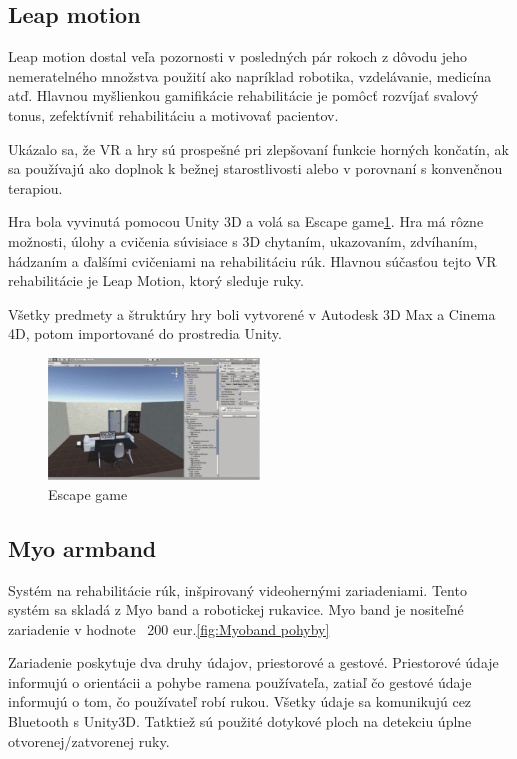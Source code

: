 \documentclass[10pt,twoside,slovak,a4paper]{article}
\begin{document}
\subsection{Leap motion}\cite{7926560}
Leap motion dostal veľa pozornosti v posledných pár rokoch z dôvodu jeho nemeratelného množstva použití ako napríklad robotika, vzdelávanie, medicína atď. Hlavnou myšlienkou gamifikácie rehabilitácie je pomôcť rozvíjať svalový tonus, zefektívniť rehabilitáciu a motivovať pacientov.

Ukázalo sa, že VR a hry sú prospešné pri zlepšovaní funkcie horných končatín, ak sa používajú ako doplnok k bežnej starostlivosti alebo v porovnaní s konvenčnou terapiou.

Hra bola vyvinutá  pomocou Unity 3D a volá sa Escape game\ref{fig:LeapMotion escape game}. Hra má rôzne možnosti, úlohy a cvičenia súvisiace s 3D chytaním, ukazovaním, zdvíhaním, hádzaním a ďalšími cvičeniami na rehabilitáciu rúk. Hlavnou súčasťou tejto VR rehabilitácie je Leap Motion, ktorý sleduje ruky. 

Všetky predmety a štruktúry hry boli vytvorené v Autodesk 3D Max a Cinema 4D, potom importované do prostredia Unity.

\begin{figure}
    \centering
    \includegraphics[width = 0.5\textwidth]{obrazky/Escape game.png}
    \caption{Escape game}
    \label{fig:LeapMotion escape game}
\end{figure}

\subsection{Myo armband}\cite{7088817}
Systém na rehabilitácie rúk, inšpirovaný videohernými zariadeniami. Tento systém sa skladá z Myo band a robotickej rukavice. Myo band je nositeľné zariadenie v hodnote ~200 eur.\ref{fig:Myoband pohyby}

Zariadenie poskytuje dva druhy údajov, priestorové a gestové. 
Priestorové údaje informujú o orientácii a pohybe ramena používateľa, zatiaľ čo gestové údaje informujú o tom, čo používateľ robí rukou. Všetky údaje sa komunikujú cez Bluetooth s Unity3D. Tatktiež sú použité dotykové ploch  na detekciu úplne otvorenej/zatvorenej ruky.
\end{document}

